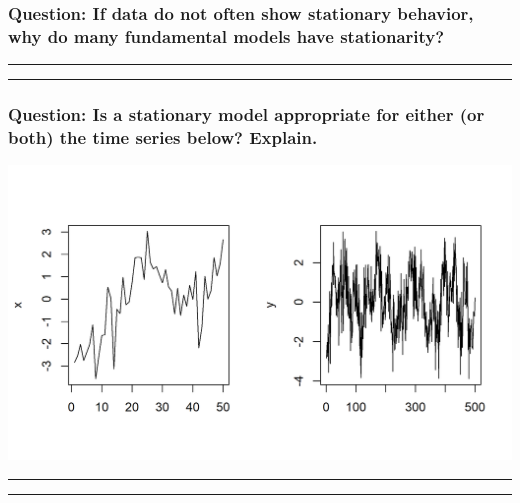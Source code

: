 \documentclass[]{article}
\begin{document}
\subsubsection{Question: If data do not often show stationary behavior,
why do many fundamental models have
stationarity?}\label{question-if-data-do-not-often-show-stationary-behavior-why-do-many-fundamental-models-have-stationarity}


\begin{center}\rule{0.5\linewidth}{\linethickness}\end{center}

\begin{center}\rule{0.5\linewidth}{\linethickness}\end{center}

\subsubsection{Question: Is a stationary model appropriate for either
(or both) the time series below?
Explain.}\label{question-is-a-stationary-model-appropriate-for-either-or-both-the-time-series-below-explain.}

\includegraphics{figure/intro-stationarity_sim-1.png}


\begin{center}\rule{0.5\linewidth}{\linethickness}\end{center}

\begin{center}\rule{0.5\linewidth}{\linethickness}\end{center}
\end{document}
